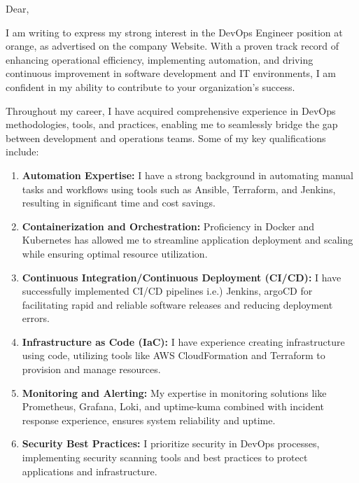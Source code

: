 \documentclass[a4paper,10pt]{letter}
\begin{document}
\begin{letter}

\date{\today}
Dear,

I am writing to express my strong interest in the DevOps Engineer position at orange, as advertised on the company Website. With a proven track record of enhancing operational efficiency, implementing automation, and driving continuous improvement in software development and IT environments, I am confident in my ability to contribute to your organization's success.

Throughout my career, I have acquired comprehensive experience in DevOps methodologies, tools, and practices, enabling me to seamlessly bridge the gap between development and operations teams. Some of my key qualifications include:

\begin{enumerate}[label=\textbf{\arabic*.}]
    \item \textbf{Automation Expertise:} I have a strong background in automating manual tasks and workflows using tools such as Ansible, Terraform, and Jenkins, resulting in significant time and cost savings.

    \item \textbf{Containerization and Orchestration:} Proficiency in Docker and Kubernetes has allowed me to streamline application deployment and scaling while ensuring optimal resource utilization.

    \item \textbf{Continuous Integration/Continuous Deployment (CI/CD):} I have successfully implemented CI/CD pipelines i.e.) Jenkins, argoCD for facilitating rapid and reliable software releases and reducing deployment errors.

    \item \textbf{Infrastructure as Code (IaC):} I have experience creating infrastructure using code, utilizing tools like AWS CloudFormation and Terraform to provision and manage resources.

    \item \textbf{Monitoring and Alerting:} My expertise in monitoring solutions like Prometheus, Grafana, Loki, and uptime-kuma combined with incident response experience, ensures system reliability and uptime.

    \item \textbf{Security Best Practices:} I prioritize security in DevOps processes, implementing security scanning tools and best practices to protect applications and infrastructure.


\end{enumerate}
\end{letter}
\end{document}
